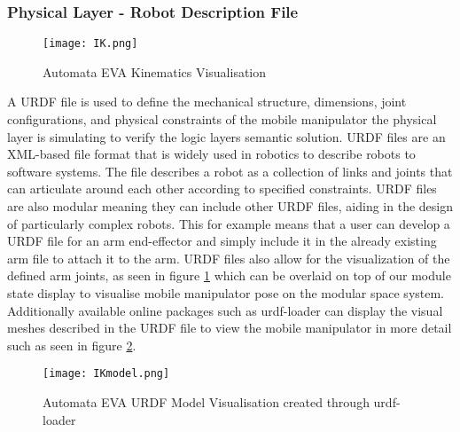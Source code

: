 \subsubsection{Physical Layer - Robot Description File}
\begin{figure}[H]
	\centering
	\texttt{[image: IK.png]}
	\caption{Automata EVA Kinematics Visualisation}
	\label{EvaIKbasic}
\end{figure}
A URDF file is used to define the mechanical structure, dimensions, joint configurations, and physical constraints of the mobile manipulator the physical layer is simulating to verify the logic layers semantic solution. URDF files are an XML-based file format that is widely used in robotics \cite{urdfProof} to describe robots to software systems. The file describes a robot as a collection of links and joints that can articulate around each other according to specified constraints. URDF files are also modular meaning they can include other URDF files, aiding in the design of particularly complex robots. This for example means that a user can develop a URDF file for an arm end-effector and simply include it in the already existing arm file to attach it to the arm. 
URDF files also allow for the visualization of the defined arm joints, as seen in figure \ref{EvaIKbasic} which can be overlaid on top of our module state display to visualise mobile manipulator pose on the modular space system. Additionally available online packages such as urdf-loader \cite{urdfLoader} can display the visual meshes described in the URDF file to view the mobile manipulator in more detail such as seen in figure \ref{EvaIKadvanced}.
\begin{figure}[H]
	\centering
	\texttt{[image: IKmodel.png]}
	\caption{Automata EVA URDF Model Visualisation created through urdf-loader \cite{urdfLoader}}
	\label{EvaIKadvanced}
\end{figure}

